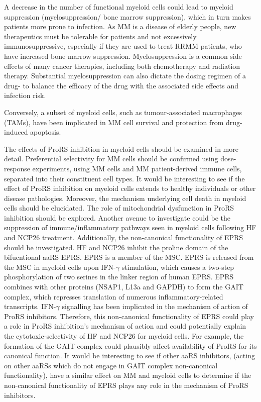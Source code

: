 A decrease in the number of functional myeloid cells could lead to myeloid suppression (myelosuppression/ bone marrow suppression), which in turn makes patients more prone to infection.
As MM is a disease of elderly people, new therapeutics must be tolerable for patients and not excessively immunosuppressive, especially if they are used to treat RRMM patients, who have increased bone marrow suppression.
Myelosuppression is a common side effects of many cancer therapies, including both chemotherapy and radiation therapy.
Substantial myelosuppression can also dictate the dosing regimen of a drug- to balance the efficacy of the drug with the associated side effects and infection risk.

Conversely, a subset of myeloid cells, such as tumour-associated macrophages (TAMs), have been implicated in MM cell survival and protection from drug-induced apoptosis.


The effects of ProRS inhibition in myeloid cells should be examined in more detail.
Preferential selectivity for MM cells should be confirmed using dose-response experiments, using MM cells and MM patient-derived immune cells, separated into their constituent cell types. %
It would be interesting to see if the effect of ProRS inhibition on myeloid cells extends to healthy individuals or other disease pathologies.
Moreover, the mechanism underlying cell death in myeloid cells should be elucidated.
The role of mitochondrial dysfunction in ProRS inhibition should be explored.
Another avenue to investigate could be the suppression of immune/inflammatory pathways seen in myeloid cells following HF and NCP26 treatment.
Additionally, the non-canonical functionality of EPRS should be investigated.
HF and NCP26 inhibit the proline domain of the bifucntional aaRS EPRS\@.
EPRS is a member of the MSC\@.
EPRS is released from the MSC in myeloid cells upon IFN-$\gamma$ stimulation, which causes a two-step phosphorylation of two serines in the linker region of human EPRS\cite{arif2009two}.
EPRS combines with other proteins (NSAP1, L13a and GAPDH) to form the GAIT complex, which represses translation of numerous inflammatory-related transcripts\cite{arif2018gait}.
IFN-$\gamma$ signalling has been implicated in the mechanism of action of ProRS inhibitors\cite{cheng2012halofugine}.
Therefore, this non-canonical functionality of EPRS could play a role in ProRS inhibition's mechanism of action and could potentially explain the cytotoxic-selectivity of HF and NCP26 for myeloid cells.
For example, the formation of the GAIT complex could plausibly affect availability of ProRS for its canonical function.
It would be interesting to see if other aaRS inhibitors, (acting on other aaRSs which do not engage in GAIT complex non-canonical functionality), have a similar effect on MM and myeloid cells to determine if the non-canonical functionality of EPRS plays any role in the mechanism of ProRS inhibitors.


